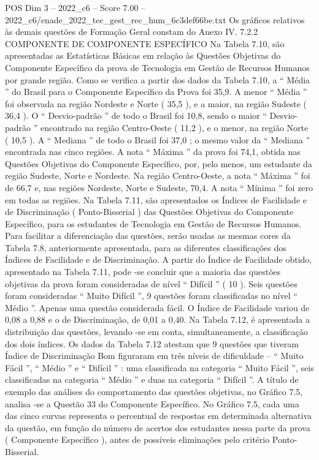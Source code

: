 \begin{textsample}{POS Dim 3 – 2022\_c6 – Score 7.00 – 2022\_c6/enade\_2022\_tec\_gest\_rec\_hum\_6c3def66be.txt}
Os gráficos relativos às demais questões de Formação Geral constam do Anexo IV. 7.2.2 COMPONENTE DE COMPONENTE ESPECÍFICO Na Tabela 7.10, são apresentadas as Estatísticas Básicas em relação às Questões Objetivas do Componente Específico da prova de Tecnologia em Gestão de Recursos Humanos por grande região.
Como se verifica a partir dos dados da Tabela 7.10, a “ Média ” do Brasil para o Componente Específico da Prova foi 35,9.
A menor “ Média ” foi observada na região Nordeste e Norte ( 35,5 ), e a maior, na região Sudeste ( 36,4 ).
O “ Desvio-padrão ” de todo o Brasil foi 10,8, sendo o maior “ Desvio-padrão ” encontrado na região Centro-Oeste ( 11,2 ), e o menor, na região Norte ( 10,5 ).
A “ Mediana ” de todo o Brasil foi 37,0 ; o mesmo valor da “ Mediana ” encontrada nas cinco regiões.
A nota “ Máxima ” da prova foi 74,1, obtida nas Questões Objetivas do Componente Específico, por, pelo menos, um estudante da região Sudeste, Norte e Nordeste.
Na região Centro-Oeste, a nota “ Máxima ” foi de 66,7 e, nas regiões Nordeste, Norte e Sudeste, 70,4.
A nota “ Mínima ” foi zero em todas as regiões.
Na Tabela 7.11, são apresentados os Índices de Facilidade e de Discriminação ( Ponto-Bisserial ) das Questões Objetivas do Componente Específico, para os estudantes de Tecnologia em Gestão de Recursos Humanos.
Para facilitar a diferenciação das questões, serão usadas as mesmas cores da Tabela 7.8, anteriormente apresentada, para as diferentes classificações dos Índices de Facilidade e de Discriminação.
A partir do Índice de Facilidade obtido, apresentado na Tabela 7.11, pode -se concluir que a maioria das questões objetivas da prova foram consideradas de nível “ Difícil ” ( 10 ).
Seis questões foram consideradas “ Muito Difícil ”, 9 questões foram classificadas no nível “ Médio ”.
Apenas uma questão considerada fácil.
O Índice de Facilidade variou de 0,08 a 0,88 e o de Discriminação, de 0,01 a 0,40.
Na Tabela 7.12, é apresentada a distribuição das questões, levando -se em conta, simultaneamente, a classificação dos dois índices.
Os dados da Tabela 7.12 atestam que 9 questões que tiveram Índice de Discriminação Bom figuraram em três níveis de dificuldade – “ Muito Fácil ”, “ Médio ” e “ Difícil ” : uma classificada na categoria “ Muito Fácil ”, seis classificadas na categoria “ Médio ” e duas na categoria “ Difícil ”.
A título de exemplo das análises do comportamento das questões objetivas, no Gráfico 7.5, analisa -se a Questão 33 do Componente Específico.
No Gráfico 7.5, cada uma das cinco curvas representa o percentual de respostas em determinada alternativa da questão, em função do número de acertos dos estudantes nessa parte da prova ( Componente Específico ), antes de possíveis eliminações pelo critério Ponto-Bisserial.

\end{textsample}
